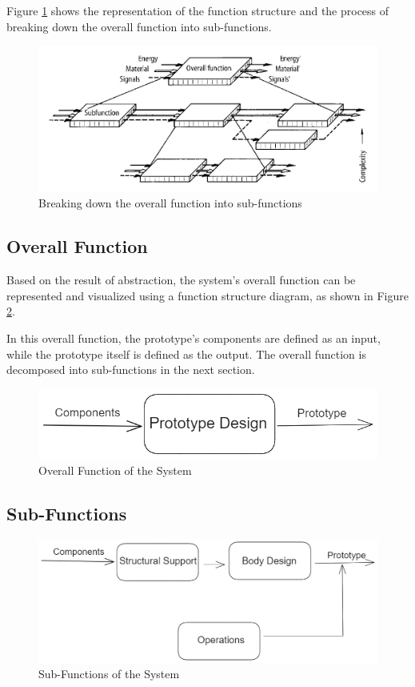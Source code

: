 Figure \ref{fig:subfunction-break} shows the representation of the function structure and the process of breaking down the overall function into sub-functions.

\begin{figure}[ht!]
    \centering
    \includegraphics[width=0.8\linewidth]{texs/Part1/chapter3/image/subfunctionbreak.png}
    \caption{Breaking down the overall function into sub-functions \cite{Pahl07q}}
    \label{fig:subfunction-break}
\end{figure}


\subsection{Overall Function}
Based on the result of abstraction, the system's overall function can be represented and visualized using a function structure diagram, as shown in Figure \ref{fig:overall-function}.

In this overall function, the prototype's components are defined as an input, while the prototype itself is defined as the output. The overall function is decomposed into sub-functions in the next section.

\begin{figure}[ht!]
    \centering
    \includegraphics[width=0.5\linewidth]{texs/Part1/chapter3/image/overallfunction.png}
    \caption{Overall Function of the System}
    \label{fig:overall-function}
\end{figure}


\subsection{Sub-Functions}
\begin{figure}[ht!]
    \centering
    \includegraphics[width=0.8\linewidth]{texs/Part1/chapter3/image/subfunction1.png}
    \caption{Sub-Functions of the System}
    \label{fig:sub-functions}
\end{figure}

